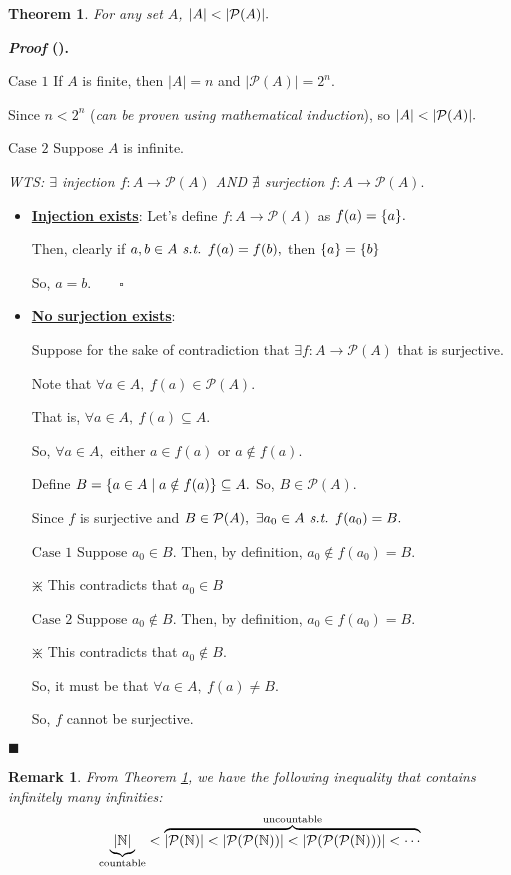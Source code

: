 \documentclass[12pt,a4paper]{article}
\newtheorem{thm}{Theorem}[subsection]
\newcounter{nprf}[subsection]
\newtheorem*{rmk}{\indent Remark}
\newenvironment*{prf}{\par\indent\textbf{\textit{Proof} (\stepcounter{nprf}\thenprf). }\par }{\par\hfill $\blacksquare$\par}
\def\N{{\mathbb{N}}}
\def\pow{{\mathcal{P}}}
\def\st{\emph{ s.t. }}
\begin{document}
\begin{framed}
\begin{thm}\label{thm6.2.2}
	For any set $A$, $\qty|A|<\qty|\pow(A)|.$	
\end{thm}
\begin{prf}
	$\boxed{\text{Case }1}$ If $A$ is finite, then $|A|=n$ and $|\pow(A)|=2^n.$\par\hspace{5mm} Since $n<2^n$ (\textit{can be proven using mathematical induction}), so $\qty|A|<\qty|\pow(A)|.$\par $\boxed{\text{Case }2}$ Suppose $A$ is infinite.\par\hspace{5mm}\textit{WTS: $\exists$ injection $f:A\to\pow(A)$ AND $\nexists$ surjection $f:A\to\pow(A).$}\begin{itemize}
		\item \textbf{\underline{Injection exists}}: Let's define $f:A\to\pow(A)$ as $f(a)=\qty{a}.$\par Then, clearly if $a,b\in A\st f(a)=f(b),$ then $\qty{a}=\qty{b}$\par So, $a=b.\qquad\square$
		\item \textbf{\underline{No surjection exists}}: \par Suppose for the sake of contradiction that $\exists f:A\to\pow(A)$ that is surjective.\par Note that $\forall a\in A,\ f(a)\in\pow(A).$\par That is, $\forall a\in A,\ f(a)\subseteq A.$\par So, $\forall a\in A,$ either $a\in f(a)$ or $a\notin f(a).$\par Define $B=\qty{a\in A\mid a\notin f(a)}\subseteq A.$ So, $B\in\pow(A).$\par Since $f$ is surjective and $B\in\pow(A),\ \exists a_0\in A\st f(a_0)=B.$\par$\boxed{\text{Case 1}}$ Suppose $a_0\in B.$ Then, by definition, $a_0\notin f(a_0)=B.$\begin{center}$\divideontimes$ This contradicts that $a_0\in B$\end{center}\par $\boxed{\text{Case }2}$ Suppose $a_0\notin B.$ Then, by definition, $a_0\in f(a_0)=B.$\begin{center}$\divideontimes$ This contradicts that $a_0\notin B.$\end{center}\par So, it must be that $\forall a\in A,\ f(a)\neq B.$\par So, $f$ cannot be surjective. 
	\end{itemize}
\end{prf}
\end{framed}
\begin{rmk}
	From Theorem \ref{thm6.2.2}, we have the following inequality that contains infinitely many infinities: \[\underbrace{\qty|\N|}_{\text{countable}}<\overbrace{\qty|\pow(\N)|<\qty|\pow(\pow(\N))|<\qty|\pow(\pow(\pow(\N)))|<\cdots}^{\text{uncountable}}\]	
\end{rmk}
\end{document}
